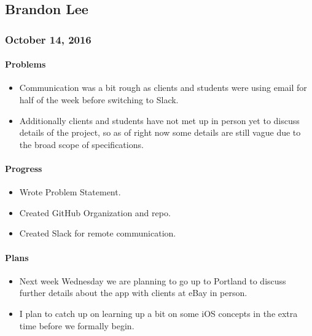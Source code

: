\subsection{Brandon Lee}

\providecommand{\tightlist}{%
  \setlength{\itemsep}{0pt}\setlength{\parskip}{0pt}}

\subsubsection{October 14, 2016}\label{section}
\paragraph{Problems}\label{problems}
\begin{itemize}
\tightlist
\item
  Communication was a bit rough as clients and students were using email
  for half of the week before switching to Slack.
\item
  Additionally clients and students have not met up in person yet to
  discuss details of the project, so as of right now some details are
  still vague due to the broad scope of specifications.
\end{itemize}
\paragraph{Progress}\label{progress}
\begin{itemize}
\tightlist
\item
  Wrote Problem Statement.
\item
  Created GitHub Organization and repo.
\item
  Created Slack for remote communication.
\end{itemize}
\paragraph{Plans}\label{plans}
\begin{itemize}
\tightlist
\item
  Next week Wednesday we are planning to go up to Portland to discuss
  further details about the app with clients at eBay in person.
\item
  I plan to catch up on learning up a bit on some iOS concepts in the
  extra time before we formally begin.
\end{itemize}

